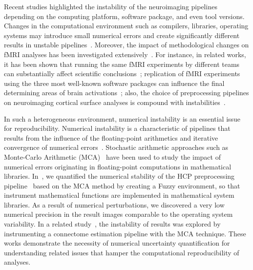 \documentclass[conference]{IEEEtran}
\begin{document}
Recent studies highlighted the instability of the neuroimaging pipelines depending on the computing platform,
software package, and even tool versions. Changes in the computational
environment such as compilers, libraries, operating systems may introduce small numerical errors and create
significantly different results in unstable pipelines~\cite{Glatard2015,Gronenschild2012,salari2020spot}.
Moreover, the impact of methodological changes on fMRI analyses has been investigated extensively~\cite{bowring2019exploring,botvinik2020variability,bhagwat2021understanding,carp2012plurality}.
For instance, in related works, it has been shown that running the same fMRI experiments by different teams can substantially affect
scientific conclusions~\cite{botvinik2020variability,carp2012plurality};
replication of fMRI experiments using the three most well-known software packages can influence the final determining areas of
brain activations~\cite{bowring2019exploring}; %
also, the choice of preprocessing pipelines on neuroimaging cortical surface analyses is compound with instabilities~\cite{bhagwat2021understanding}.

In such a heterogeneous environment, numerical instability is an essential issue for reproducibility.
Numerical instability is a characteristic of pipelines that results from the influence of the floating-point arithmetics
and iterative convergence of numerical errors~\cite{freitas2002issue}.
Stochastic arithmetic approaches such as Monte-Carlo Arithmetic (MCA)~\cite{Parker1997-qq} have been used to study the impact of numerical errors
originating in floating-point computations in mathematical libraries.
In~\cite{salari2021accurate}, we quantified the numerical stability of the HCP preprocessing pipeline~\cite{glasser2013} based on the MCA method
by creating a Fuzzy environment, so that instrument mathematical functions are implemented in mathematical system libraries.
As a result of numerical perturbations, we discovered a very low numerical precision in the result images comparable to the operating system variability.
In a related study~\cite{kiar2020numerical}, the instability of results was explored by instrumenting a connectome estimation pipeline with the MCA technique.
These works demonstrate the necessity of numerical uncertainty quantification for understanding related issues that hamper the computational reproducibility of analyses.
\end{document}
